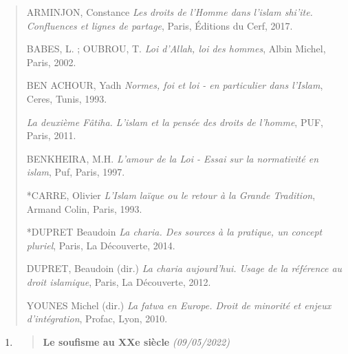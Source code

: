\begin{quote}
ARMINJON, Constance \emph{Les droits de l'Homme dans l'islam shi'ite.
Confluences et lignes de partage}, Paris, Éditions du Cerf, 2017.

BABES, L. ; OUBROU, T. \emph{Loi d'Allah, loi des hommes}, Albin Michel,
Paris, 2002.

BEN ACHOUR, Yadh \emph{Normes, foi et loi - en particulier dans
l'Islam}, Ceres, Tunis, 1993.

\emph{La deuxième Fâtiha. L'islam et la pensée des droits de l'homme},
PUF, Paris, 2011.

BENKHEIRA, M.H. \emph{L'amour de la Loi - Essai sur la normativité en
islam}, Puf, Paris, 1997.

*CARRE, Olivier \emph{L'Islam laïque ou le retour à la Grande
Tradition}, Armand Colin, Paris, 1993.

*DUPRET Beaudoin \emph{La charia. Des sources à la pratique, un concept
pluriel}, Paris, La Découverte, 2014.

DUPRET, Beaudoin (dir.) \emph{La charia aujourd'hui. Usage de la
référence au droit islamique}, Paris, La Découverte, 2012.

YOUNES Michel (dir.) \emph{La fatwa en Europe. Droit de minorité et
enjeux d'intégration}, Profac, Lyon, 2010.
\end{quote}

\begin{enumerate}
\def\labelenumi{\arabic{enumi}.}
\setcounter{enumi}{2}
\item
  \begin{quote}
  \textbf{{Le soufisme au XXe siècle}} \emph{(09/05/2022)}
  \end{quote}
\end{enumerate}

